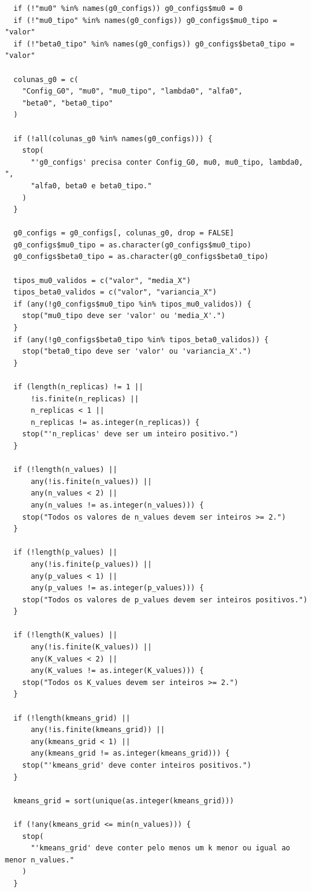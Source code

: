 \begin{verbatim}
  if (!"mu0" %in% names(g0_configs)) g0_configs$mu0 = 0
  if (!"mu0_tipo" %in% names(g0_configs)) g0_configs$mu0_tipo = "valor"
  if (!"beta0_tipo" %in% names(g0_configs)) g0_configs$beta0_tipo = "valor"
  
  colunas_g0 = c(
    "Config_G0", "mu0", "mu0_tipo", "lambda0", "alfa0",
    "beta0", "beta0_tipo"
  )
  
  if (!all(colunas_g0 %in% names(g0_configs))) {
    stop(
      "'g0_configs' precisa conter Config_G0, mu0, mu0_tipo, lambda0, ",
      "alfa0, beta0 e beta0_tipo."
    )
  }
  
  g0_configs = g0_configs[, colunas_g0, drop = FALSE]
  g0_configs$mu0_tipo = as.character(g0_configs$mu0_tipo)
  g0_configs$beta0_tipo = as.character(g0_configs$beta0_tipo)
  
  tipos_mu0_validos = c("valor", "media_X")
  tipos_beta0_validos = c("valor", "variancia_X")
  if (any(!g0_configs$mu0_tipo %in% tipos_mu0_validos)) {
    stop("mu0_tipo deve ser 'valor' ou 'media_X'.")
  }
  if (any(!g0_configs$beta0_tipo %in% tipos_beta0_validos)) {
    stop("beta0_tipo deve ser 'valor' ou 'variancia_X'.")
  }
  
  if (length(n_replicas) != 1 ||
      !is.finite(n_replicas) ||
      n_replicas < 1 ||
      n_replicas != as.integer(n_replicas)) {
    stop("'n_replicas' deve ser um inteiro positivo.")
  }
  
  if (!length(n_values) ||
      any(!is.finite(n_values)) ||
      any(n_values < 2) ||
      any(n_values != as.integer(n_values))) {
    stop("Todos os valores de n_values devem ser inteiros >= 2.")
  }
  
  if (!length(p_values) ||
      any(!is.finite(p_values)) ||
      any(p_values < 1) ||
      any(p_values != as.integer(p_values))) {
    stop("Todos os valores de p_values devem ser inteiros positivos.")
  }
  
  if (!length(K_values) ||
      any(!is.finite(K_values)) ||
      any(K_values < 2) ||
      any(K_values != as.integer(K_values))) {
    stop("Todos os K_values devem ser inteiros >= 2.")
  }
  
  if (!length(kmeans_grid) ||
      any(!is.finite(kmeans_grid)) ||
      any(kmeans_grid < 1) ||
      any(kmeans_grid != as.integer(kmeans_grid))) {
    stop("'kmeans_grid' deve conter inteiros positivos.")
  }
  
  kmeans_grid = sort(unique(as.integer(kmeans_grid)))
  
  if (!any(kmeans_grid <= min(n_values))) {
    stop(
      "'kmeans_grid' deve conter pelo menos um k menor ou igual ao menor n_values."
    )
  }
  

\end{verbatim}
